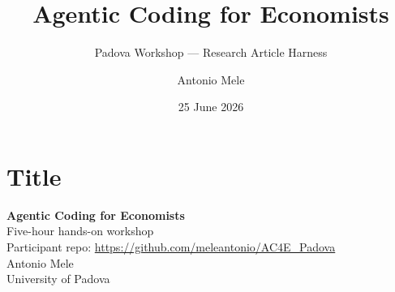 

\newcommand{\modebox}[1]{\fcolorbox{courseblue}{white}{\small\textsf{#1}}}

\renewcommand{\WorkshopRepoUrl}{\url{https://github.com/meleantonio/AC4E_Padova}}
\renewcommand{\ParentCourseUrl}{\url{https://github.com/meleantonio/AC4E_Pavia}}
\title{Agentic Coding for Economists}
\subtitle{Padova Workshop — Research Article Harness}
\author{Antonio Mele}
\date{25 June 2026}



\section{Title}

\begin{frame}{}
  \begin{center}
    {\LARGE \textbf{Agentic Coding for Economists}} \\
    \vspace{0.5em}
    {\large Five-hour hands-on workshop} \\
    \vspace{0.5em}
    {\small Participant repo: \WorkshopRepoUrl} \\
    \vspace{0.75em}
    Antonio Mele \\
    University of Padova \\
    \vspace{0.5em}
  \end{center}
\end{frame}


